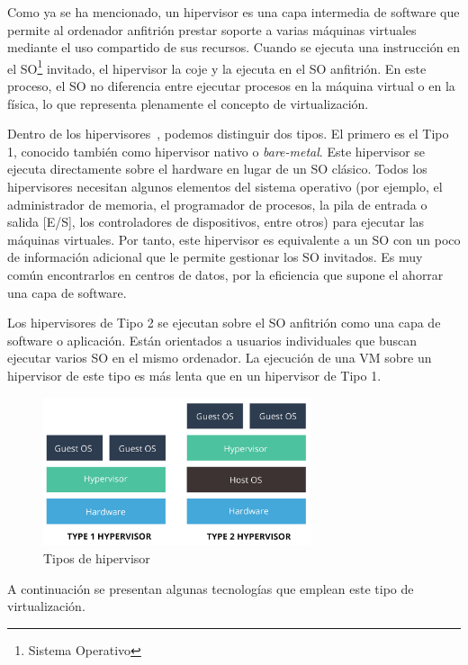 Como ya se ha mencionado, un hipervisor es una capa intermedia de software que permite al ordenador anfitrión prestar soporte a varias máquinas virtuales mediante el uso compartido de sus recursos. Cuando se ejecuta una instrucción en el SO\footnote{Sistema Operativo} invitado, el hipervisor la coje y la ejecuta en el SO anfitrión. En este proceso, el SO no diferencia entre ejecutar procesos en la máquina virtual o en la física, lo que representa plenamente el concepto de virtualización.

Dentro de los hipervisores~\cite{virt3}, podemos distinguir dos tipos. El primero es el Tipo 1, conocido también como hipervisor nativo o \textit{bare-metal}. Este hipervisor se ejecuta directamente sobre el hardware en lugar de un SO clásico. Todos los hipervisores necesitan algunos elementos del sistema operativo (por ejemplo, el administrador de memoria, el programador de procesos, la pila de entrada o salida [E/S], los controladores de dispositivos, entre otros) para ejecutar las máquinas virtuales. Por tanto, este hipervisor es equivalente a un SO con un poco de información adicional que le permite gestionar los SO invitados. Es muy común encontrarlos en centros de datos, por la eficiencia que supone el ahorrar una capa de software.

Los hipervisores de Tipo 2 se ejecutan sobre el SO anfitrión como una capa de software o aplicación. Están orientados a usuarios individuales que buscan ejecutar varios SO en el mismo ordenador. La ejecución de una VM sobre un hipervisor de este tipo es más lenta que en un hipervisor de Tipo 1.

\begin{figure}[h]
\centering
\includegraphics[width=0.7\textwidth]{../imgs/EdA/hipervisor.jpg}
\caption{Tipos de hipervisor}
\label{fig:hipervtypes}
\end{figure}

A continuación se presentan algunas tecnologías que emplean este tipo de virtualización.
\clearpage

